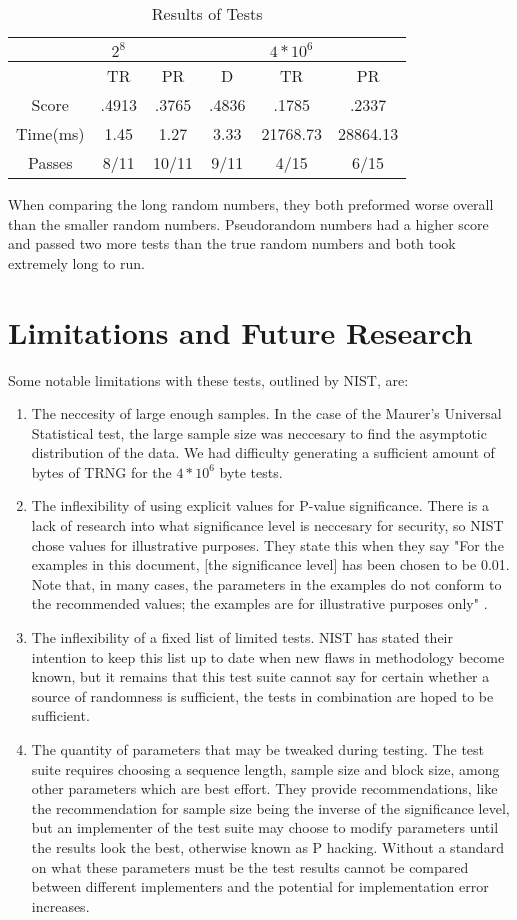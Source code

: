 \documentclass[11pt,letterpaper,conference]{IEEEtran}
\begin{document}
\begin{table}[hbp]
\centering
\begin{tabular}{|c|c|c|c|c|c|} \hline
 &$2^8$ & & &$4*10^6$ & \\ \hline
 &TR &PR &D &TR &PR \\ \hline
 Score &.4913 &.3765 &.4836 &.1785 &.2337 \\ \hline
Time(ms) &1.45 &1.27 &3.33 &21768.73 &28864.13 \\ \hline
Passes &8/11 &10/11 &9/11 &4/15 &6/15 \\ \hline 
\end{tabular}
\caption{Results of Tests}
\label{table:Results}
\end{table}

When comparing the long random numbers, they both preformed worse overall than the smaller random numbers. Pseudorandom numbers had a higher score and passed two more tests than the true random numbers and both took extremely long to run.

\section{Limitations and Future Research}
Some notable limitations with these tests, outlined by NIST, are:

\begin{enumerate}
\item The neccesity of large enough samples. In the case of the Maurer's Universal Statistical test,
the large sample size was neccesary to find the asymptotic distribution of the data. We had difficulty
generating a sufficient amount of bytes of TRNG for the $4*10^6$ byte tests.
\item The inflexibility of using explicit values for P-value significance. There is a lack of research
into what significance level is neccesary for security, so NIST chose values for illustrative purposes.
They state this when they say "For the examples in this document, [the significance level] has been
chosen to be 0.01. Note that, in many cases, the parameters in the examples do not conform to the
recommended values; the examples are for illustrative purposes only" \cite{nistbook}.
\item The inflexibility of a fixed list of limited tests. NIST has stated their intention to keep this
list up to date when new flaws in methodology become known, but it remains that this test suite cannot
say for certain whether a source of randomness is sufficient, the tests in combination are hoped to
be sufficient.
\item The quantity of parameters that may be tweaked during testing. The test suite requires choosing
a sequence length, sample size and block size, among other parameters which are best effort. They
provide recommendations, like the recommendation for sample size being the inverse of the
significance level, but an implementer of the test suite may choose to modify parameters until
the results look the best, otherwise known as P hacking. Without a standard on what these parameters
must be the test results cannot be compared between different implementers and the potential for
implementation error increases.
\end{enumerate}
\end{document}
